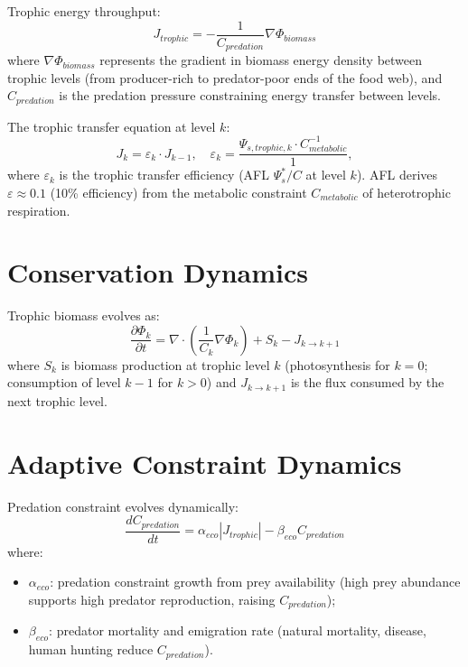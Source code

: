 \documentclass[11pt]{article}
\begin{document}
Trophic energy throughput:
\begin{equation}
J_{trophic} = -\frac{1}{C_{predation}}\nabla \Phi_{biomass}
\end{equation}
where $\nabla\Phi_{biomass}$ represents the gradient in biomass energy density between trophic
levels (from producer-rich to predator-poor ends of the food web), and $C_{predation}$ is the
predation pressure constraining energy transfer between levels.

The trophic transfer equation at level $k$:
\begin{equation}
J_k = \varepsilon_k \cdot J_{k-1}, \quad \varepsilon_k = \frac{\Psi_{s,trophic,k} \cdot C_{metabolic}^{-1}}{1},
\end{equation}
where $\varepsilon_k$ is the trophic transfer efficiency (AFL $\Psi_s^*/C$ at level $k$). AFL derives
$\varepsilon \approx 0.1$ (10\% efficiency) from the metabolic constraint $C_{metabolic}$ of
heterotrophic respiration.

\section{Conservation Dynamics}

Trophic biomass evolves as:
\begin{equation}
\frac{\partial \Phi_k}{\partial t} = \nabla \cdot \left(\frac{1}{C_k}\nabla \Phi_k\right) + S_k - J_{k \to k+1}
\end{equation}
where $S_k$ is biomass production at trophic level $k$ (photosynthesis for $k=0$; consumption
of level $k-1$ for $k > 0$) and $J_{k \to k+1}$ is the flux consumed by the next trophic level.

\section{Adaptive Constraint Dynamics}

Predation constraint evolves dynamically:
\begin{equation}
\frac{dC_{predation}}{dt} = \alpha_{eco}|J_{trophic}| - \beta_{eco} C_{predation}
\end{equation}
where:
\begin{itemize}
    \item $\alpha_{eco}$: predation constraint growth from prey availability (high prey abundance
          supports high predator reproduction, raising $C_{predation}$);
    \item $\beta_{eco}$: predator mortality and emigration rate (natural mortality, disease,
          human hunting reduce $C_{predation}$).
\end{itemize}
\end{document}
